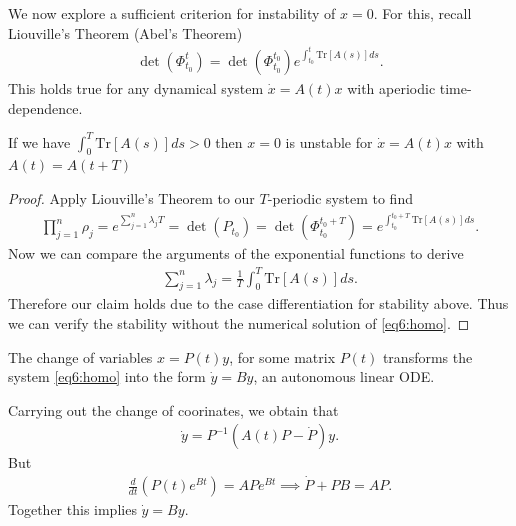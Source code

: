 We now explore a sufficient criterion for instability of $x=0$. For this, recall Liouville's Theorem (Abel's Theorem)
\begin{align}
	\boxed{
		\det (\Phi_{t_0}^{t}) = \det(\Phi_{t_0}^{t_0})e^{\int_{t_0}^{t}  \textrm{Tr} \left[ A(s) \right] ds}.
	}
\end{align}
This holds true for any dynamical system $\dot{x}=A(t)x$ with aperiodic time-dependence.
\begin{proposition}
	If we have $\int_{0}^{T}  \textrm{Tr} [A(s)]ds>0$ then $x=0$ is unstable for $\dot{x}=A(t)x$ with $A(t) = A(t+T)$
\end{proposition}
\begin{proof}
Apply Liouville's Theorem to our $T$-periodic system to find
\begin{align}
	\prod_{j=1}^{n} \rho_j = e^{\sum_{j=1}^{n} \lambda_j T} = \det(P_{t_0})	= \det(\Phi_{t_0}^{t_0+T}) = e^{\int_{t_0}^{t_0+T}  \textrm{Tr} \left[ A(s) \right] ds}.	
\end{align}
Now we can compare the arguments of the exponential functions to derive
\begin{align}
	\boxed{
		\sum_{j=1}^{n} \lambda _j = \frac{1}{T} \int_{0}^{T}  \textrm{Tr} \left[A(s) \right] ds.
	}
\end{align}
Therefore our claim holds due to the case differentiation for stability above.  Thus we can verify the stability without the numerical solution of \eqref{eq6:homo}.
\end{proof}
\begin{remark}[]
	The change of variables $x = P(t)y$, for some matrix $P(t)$ transforms the system \eqref{eq6:homo} into the form $\dot{y}=By$, an autonomous linear ODE.
	
	Carrying out the change of coorinates, we obtain that
	\begin{align}
		\dot{y} = P^{-1} (A(t)P - \dot{P})y.
	\end{align}
But
\begin{align}
	\frac{d}{dt}\left( P(t)e^{Bt}\right) = APe^{Bt} \implies \dot{P} + PB = AP.
\end{align}
Together this implies $\dot{y} = By$.
\end{remark}

